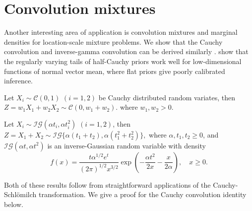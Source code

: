 \documentclass[ECP]{ejpecp} %
\def\CS{Cauchy-Schl\"omilch}
\newcommand{\InvGaussRV}{\mathcal{IG}}
\newcommand{\CauchyRV}{\mathcal{C}}
\begin{document}
\section{Convolution mixtures}
\label{sec:convolutions}

Another interesting area of application is convolution mixtures and marginal densities for location-scale mixture problems. We show that the Cauchy
convolution \cite{pillai2015unexpected} and inverse-gamma convolution can be derived similarly \cite{polson_halfcauchy_2012}. \cite{bhadra_default_2016} show that the regularly varying tails of half-Cauchy priors work well for low-dimensional functions of normal vector mean, where flat priors give poorly calibrated inference. 
\begin{lemma}
  Let $X_i \sim \CauchyRV(0,1)$ $(i = 1, 2)$ be Cauchy distributed random variates, then $Z = w_1 X_1 + w_2 X_2 \sim \CauchyRV( 0, w_1 + w_2).$ where $w_1,w_2 > 0$.
\end{lemma}
\begin{lemma}
  Let $X_i \sim \InvGaussRV(\alpha t_i, \alpha t_i^2)$ $(i = 1, 2)$, then $Z = X_1 + X_2 \sim \InvGaussRV\{\alpha (t_1 + t_2), \alpha (t_1^2+t_2^2)\},$ where $\alpha, t_1, t_2 \geq 0$, and $\InvGaussRV(\alpha t, \alpha t^2)$ is an inverse-Gaussian random variable with density
\[
    f(x) = \frac{t \alpha^{1/2} e^t}{(2 \pi)^{1/2} x^{3/2}} 
    \exp\left( -\frac{\alpha t^2}{2x} - \frac{x}{2\alpha} \right), \quad x \geq 0.
\]
\end{lemma}

Both of these results follow from straightforward applications of the \CS{} 
transformation. We give a proof for the Cauchy convolution identity below.
\end{document}
